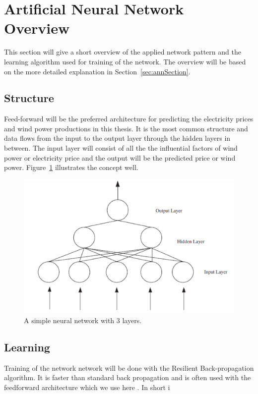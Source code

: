 \section{Artificial Neural Network Overview}
This section will give a short overview of the applied network pattern and the learning algorithm used for training of the network. The overview will be based on the more detailed explanation in Section~\ref{sec:annSection}.

\subsection{Structure}
Feed-forward will be the preferred architecture for predicting the electricity prices and wind power productions in this thesis. It is the most common structure and data flows from the input to the output layer through the hidden layers in between. The input layer will consist of all the the influential factors of wind power or electricity price and the output will be the predicted price or wind power. Figure~\ref{fig:overviewAnn} illustrates the concept well.

\begin{figure}[!ht]
\centering
\includegraphics[width=0.8\linewidth]{billeder/ANN.png}
\caption{A simple neural network with 3 layers. \cite{stockForecasting}}
\label{fig:overviewAnn}
\end{figure}

\subsection{Learning}
Training of the network network will be done with the Resilient Back-propagation algorithm. It is faster than standard back propagation \cite{8,15} and is often used with the feedforward architecture which we use here \cite{14,17}. In short i


